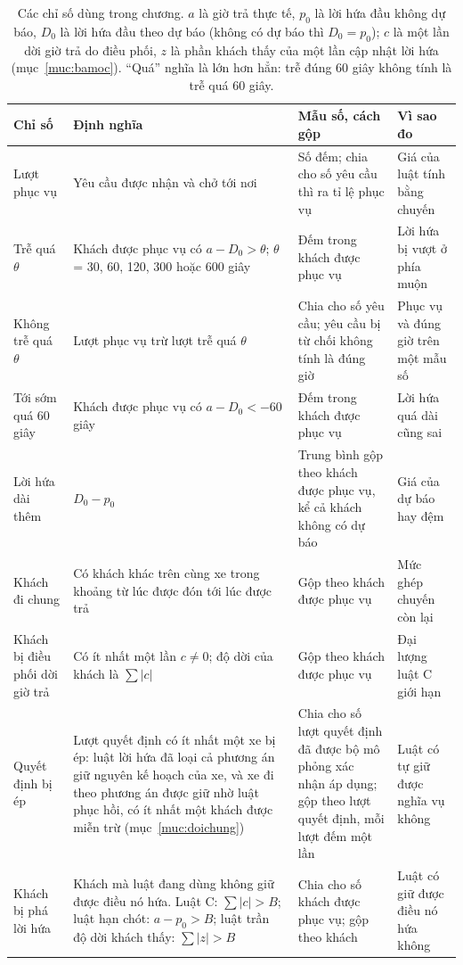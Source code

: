 \begin{table}[htbp]
\centering
\caption[Định nghĩa các chỉ số đánh giá]{Các chỉ số dùng trong chương. $a$ là giờ trả thực tế, $p_0$ là lời hứa đầu không dự báo, $D_0$
là lời hứa đầu theo dự báo (không có dự báo thì $D_0 = p_0$); $c$ là một lần dời giờ trả do điều phối, $z$ là phần
khách thấy của một lần cập nhật lời hứa (mục~\ref{muc:bamoc}). ``Quá'' nghĩa là lớn hơn hẳn: trễ đúng 60 giây
không tính là trễ quá 60 giây.}
\label{bang:c4-chiso}
\footnotesize
\setlength{\tabcolsep}{3pt}
\begin{tabular}{@{}p{2.7cm}p{5.3cm}p{3.5cm}p{3.5cm}@{}}
\toprule
\textbf{Chỉ số} & \textbf{Định nghĩa} & \textbf{Mẫu số, cách gộp} & \textbf{Vì sao đo}\\
\midrule
Lượt phục vụ & Yêu cầu được nhận và chở tới nơi & Số đếm; chia cho số yêu cầu thì ra tỉ lệ phục vụ & Giá của
luật tính bằng chuyến\\
Trễ quá $\theta$ & Khách được phục vụ có $a - D_0 > \theta$; $\theta$ = 30, 60, 120, 300 hoặc 600 giây & Đếm trong
khách được phục vụ & Lời hứa bị vượt ở phía muộn\\
Không trễ quá $\theta$ & Lượt phục vụ trừ lượt trễ quá $\theta$ & Chia cho số yêu cầu; yêu cầu bị từ chối không
tính là đúng giờ & Phục vụ và đúng giờ trên một mẫu số\\
Tới sớm quá 60 giây & Khách được phục vụ có $a - D_0 < -60$ giây & Đếm trong khách được phục vụ & Lời
hứa quá dài cũng sai\\
Lời hứa dài thêm & $D_0 - p_0$ & Trung bình gộp theo khách được phục vụ, kể cả khách không có dự báo & Giá của
dự báo hay đệm\\
Khách đi chung & Có khách khác trên cùng xe trong khoảng từ lúc được đón tới lúc được trả & Gộp theo
khách được phục vụ & Mức ghép chuyến còn lại\\
Khách bị điều phối dời giờ trả & Có ít nhất một lần $c \neq 0$; độ dời của khách là $\sum|c|$ &
Gộp theo khách được phục vụ & Đại lượng luật C giới hạn\\
Quyết định bị ép & Lượt quyết định có ít nhất một xe bị ép: luật lời hứa đã loại cả phương án giữ nguyên kế hoạch
của xe, và xe đi theo phương án được giữ nhờ luật phục hồi, có ít nhất một khách được miễn trừ
(mục~\ref{muc:doichung}) & Chia cho số lượt quyết định đã được bộ mô phỏng xác nhận áp dụng; gộp theo
lượt quyết định, mỗi lượt đếm một lần & Luật có tự giữ được nghĩa vụ không\\
Khách bị phá lời hứa & Khách mà luật đang dùng không giữ được điều nó hứa. Luật C: $\sum|c| > B$; luật hạn chót:
$a - p_0 > B$; luật trần độ dời khách thấy: $\sum|z| > B$ & Chia cho số khách được phục vụ; gộp theo
khách & Luật có giữ được điều nó hứa không\\
\bottomrule
\end{tabular}
\end{table}

